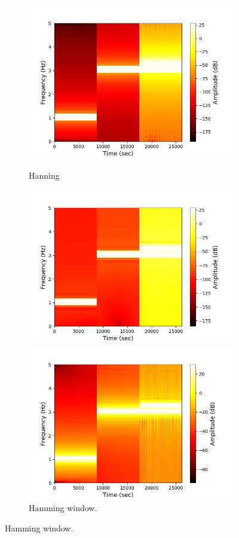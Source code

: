 \begin{figure}[H]
\centering
\begin{subfigure}{0.49\textwidth}
\centering
\includegraphics[width=\textwidth]{figures/stft_windows/100/hanning.png}
\caption{Hanning}
\label{fig:stft_hanning_100}
\includegraphics[width=\textwidth]{figures/stft_windows/100/hamming.png}
\caption{Hamming window.}
\label{fig:stft_hamming_100}
\includegraphics[width=\textwidth]{figures/stft_windows/100/kaiser_4.png}

\end{subfigure}
\end{figure}

